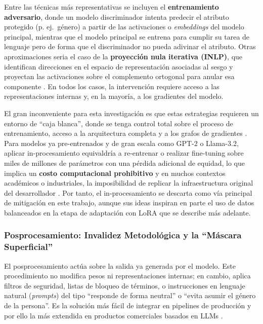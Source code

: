 \documentclass[12pt,a4paper]{report}
\begin{document}
Entre las técnicas más representativas se incluyen el \textbf{entrenamiento adversario}, donde un modelo discriminador intenta predecir el atributo protegido (p. ej.\ género) a 
partir de las activaciones o \textit{embeddings} del modelo principal, mientras que el modelo principal se entrena para cumplir su tarea de lenguaje pero de forma que el 
discriminador no pueda adivinar el atributo. Otras aproximaciones seria el caso de la \textbf{proyección nula iterativa (INLP)}, que identifican direcciones en el espacio de representación 
asociadas al sesgo y proyectan las activaciones sobre el complemento ortogonal para anular esa componente \cite{meade_empirical_2021}. En todos los casos, la intervención 
requiere acceso a las representaciones internas y, en la mayoría, a los gradientes del modelo.

El gran inconveniente para esta investigación es que estas estrategias requieren un entorno de ``caja blanca'', donde se tenga control total sobre el proceso de entrenamiento, 
acceso a la arquitectura completa y a los grafos de gradientes \cite{guo_bias_2024}. Para modelos ya pre-entrenados y de gran escala como GPT-2 o Llama-3.2, 
aplicar in-procesamiento equivaldría a re-entrenar o realizar fine-tuning sobre miles de millones de parámetros con una pérdida adicional de equidad, lo que implica un 
\textbf{costo computacional prohibitivo} y en muchos contextos académicos o industriales, la imposibilidad de replicar la infraestructura original del desarrollador 
\cite{guo_bias_2024, meade_empirical_2021}. Por tanto, el in-procesamiento se descarta como vía principal de mitigación en este trabajo, aunque sus ideas 
inspiran en parte el uso de datos balanceados en la etapa de adaptación con LoRA que se describe más adelante.

\subsubsection{Posprocesamiento: Invalidez Metodológica y la ``Máscara Superficial''}

El posprocesamiento actúa sobre la salida ya generada por el modelo. Este procedimiento no modifica pesos ni representaciones internas; en cambio, aplica filtros de seguridad, 
listas de bloqueo de términos, o instrucciones en lenguaje natural (\textit{prompts}) del tipo ``responde de forma neutral'' o ``evita asumir el género de la persona''. 
Es la solución más fácil de integrar en pipelines de producción y por ello la más extendida en productos comerciales basados en LLMs \cite{huang_bias_2025}.
\end{document}
